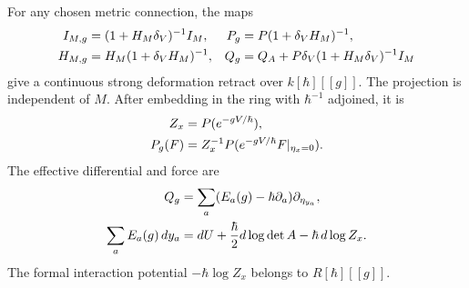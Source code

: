 \begin{theorem}\label{cbc:cf:interaction}
For any chosen metric connection, the maps
\begin{align}
 I_{M,g}&=(1+H_M\delta_V)^{-1}I_M,&
 P_g&=P(1+\delta_VH_M)^{-1},\notag\\
 H_{M,g}&=H_M(1+\delta_VH_M)^{-1},&
 Q_g&=Q_A+P\delta_V(1+H_M\delta_V)^{-1}I_M
 \label{cbc:cf:interacting-maps}
\end{align}
give a continuous strong deformation retract over $k[\hbar][[g]]$.
The projection is independent of $M$. After embedding in the
ring with $\hbar^{-1}$ adjoined, it is
\begin{align}
 Z_x&=P(e^{-gV/\hbar}),\notag\\
 P_g(F)&=Z_x^{-1}P(e^{-gV/\hbar}F|_{\eta_x=0}).
 \label{cbc:cf:normalized}
\end{align}
The effective differential and force are
\begin{align}
 Q_g&=\sum_a(E_a(g)-\hbar\partial_a)\partial_{\eta_{y_a}},
 \notag\\
 \sum_aE_a(g)\,dy_a
   &=dU+\frac{\hbar}{2}d\log\det A-\hbar\,d\log Z_x.
 \label{cbc:cf:interacting-force}
\end{align}
The formal interaction potential $-\hbar\log Z_x$ belongs
to $R[\hbar][[g]]$.
\end{theorem}
